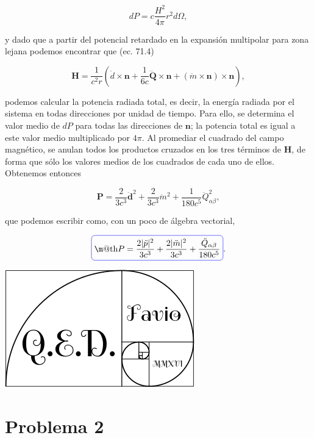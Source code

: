 \documentclass[a4paper,11pt]{article}
\makeatletter
\numberwithin{equation}{section}
\newcommand*{\boxcolor}{blue}
\renewcommand{\boxed}[1]{\textcolor{\boxcolor}{%
\tikz[baseline={([yshift=-1ex]current bounding box.center)}] \node [rectangle, minimum width=1ex,rounded corners,draw] {\normalcolor\m@th$\displaystyle#1$};}}
\makeatother
\begin{document}
\begin{equation}
 dP = c \frac{H^2}{4\pi}r^2 d\Omega,
\end{equation}

y dado que a partir del potencial retardado en la expansión multipolar para zona 
lejana podemos encontrar que (ec. 71.4) 

\begin{equation}
 \mathbf{H} = \frac{1}{c^2r}\left(\ddot{d} \times \mathbf{n} + 
 \frac{1}{6c}\dddot{\mathbf{Q}} \times \mathbf{n} + 
 (\ddot{m} \times \mathbf{n}) \times \mathbf{n}\right),
\end{equation}

podemos calcular la potencia radiada total, es decir, la energía radiada por el sistema 
en todas direcciones por unidad de tiempo. Para ello, se determina el valor medio 
de $dP$ para todas las direcciones de $\mathbf{n}$; la potencia total es igual 
a este valor medio multiplicado por $4\pi$. Al promediar el cuadrado del 
campo magnético, se anulan todos los productos cruzados en los tres términos de 
$\mathbf{H}$, de forma que sólo los valores medios de los cuadrados de cada uno de 
ellos. Obtenemos entonces 

\begin{equation}
 \mathbf{P} = \frac{2}{3c^3}\ddot{\mathbf{d}}^2 + \frac{2}{3c^3}\ddot{m}^2 + 
 \frac{1}{180c^5}\ddot{Q}^2_{\alpha\beta},
\end{equation}

que podemos escribir como, con un poco de álgebra vectorial, 

\begin{equation}
 \boxed{P = \frac{2|\ddot{p}|^2}{3c^3} + \frac{2|\ddot{m}|^2}{3c^3} +
 \frac{\ddot{Q}_{\alpha\beta}}{180c^5}}.
\end{equation}

\hspace{10cm}\includegraphics[scale=0.25]{logoQED}

\section{Problema 2}
\end{document}
